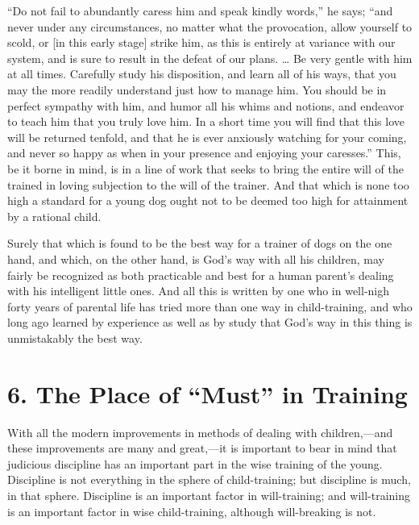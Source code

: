 \documentclass[
]{book}
\begin{document}
``Do not fail to abundantly caress him and speak kindly words,'' he says; ``and never under any circumstances, no matter what the provocation, allow yourself to scold, or {[}in this early stage{]} strike him, as this is entirely at variance with our system, and is sure to result in the defeat of our plans. \ldots{} Be very gentle with him at all times. Carefully study his disposition, and learn all of his ways, that you may the more readily understand just how to manage him. You should be in perfect sympathy with him, and humor all his whims and notions, and endeavor to teach him that you truly love him. In a short time you will find that this love will be returned tenfold, and that he is ever anxiously watching for your coming, and never so happy as when in your presence and enjoying your caresses.'' This, be it borne in mind, is in a line of work that seeks to bring the entire will of the trained in loving subjection to the will of the trainer. And that which is none too high a standard for a young dog ought not to be deemed too high for attainment by a rational child.

Surely that which is found to be the best way for a trainer of dogs on the one hand, and which, on the other hand, is God's way with all his children, may fairly be recognized as both practicable and best for a human parent's dealing with his intelligent little ones. And all this is written by one who in well-nigh forty years of parental life has tried more than one way in child-training, and who long ago learned by experience as well as by study that God's way in this thing is unmistakably the best way.

\hypertarget{the-place-of-must-in-training}{%
\chapter{6. The Place of ``Must'' in Training}\label{the-place-of-must-in-training}}

With all the modern improvements in methods of dealing with children,---and these improvements are many and great,---it is important to bear in mind that judicious discipline has an important part in the wise training of the young. Discipline is not everything in the sphere of child-training; but discipline is much, in that sphere. Discipline is an important factor in will-training; and will-training is an important factor in wise child-training, although will-breaking is not.
\end{document}
